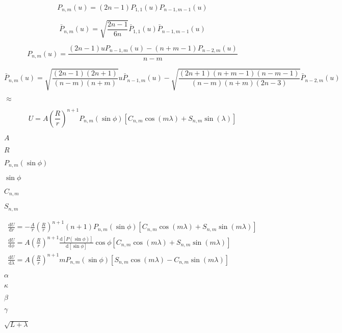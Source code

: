 \documentclass{article}
\begin{document}
\[ P_{ n, m }( u ) = ( 2 n - 1 ) P_{ 1, 1 }( u ) P_{ n - 1, m - 1 }( u ) \]
\pagebreak

\[ \bar{ P }_{ n, m }( u ) = \sqrt{ \frac{ 2 n - 1 }{ 6 n } } \bar{ P }_{ 1, 1 }( u ) \bar{ P }_{ n - 1, m - 1 }( u ) \]
\pagebreak

\[ P_{ n, m }( u ) = \frac{ ( 2 n - 1 ) u P_{ n - 1, m }( u ) - ( n + m - 1 ) P_{ n - 2, m }( u ) }{ n - m } \]
\pagebreak

\[ \bar{ P }_{ n, m }( u ) = \sqrt{ \frac{ ( 2 n - 1 )( 2 n + 1 ) }{ ( n - m ) ( n + m ) } } u \bar{ P }_{ n - 1, m }( u ) - \sqrt{ \frac{ ( 2 n + 1 )( n + m - 1 ) ( n - m - 1 ) } { ( n - m)( n + m )( 2 n - 3 ) } } \bar{ P }_{ n - 2, m }( u ) \]
\pagebreak

$\approx$
\pagebreak

\[ U = A \left( \frac{ R }{ r} \right) ^{ n + 1} P _{ n, m } ( \sin \phi ) \left[ C _{ n, m } \cos( m \lambda ) + S _{ n, m } \sin( \lambda ) \right] \]
\pagebreak

$ A $
\pagebreak

$ R $
\pagebreak

$ P _{ n, m }( \sin \phi ) $
\pagebreak

$ \sin \phi $
\pagebreak

$ C _{ n, m } $
\pagebreak

$ S _{ n, m } $
\pagebreak

\begin{eqnarray*} \frac{ \mathrm{ d } U }{ \mathrm{ d } r } = -\frac{ A }{ r } \left( \frac{ R }{ r } \right) ^{ n + 1 } ( n + 1 ) P_{ n, m }( \sin \phi )[ C_{ n, m } \cos( m \lambda ) + S_{ n,m } \sin( m \lambda ) ] \\ \frac{ \mathrm{ d } U }{ \mathrm{ d } \phi } = A \left( \frac{ R }{ r } \right)^{ n + 1 } \frac{ \mathrm{ d } [ P( \sin \phi ) ] }{ \mathrm{ d } [ \sin \phi ] } \cos \phi [ C_{ n, m } \cos( m \lambda ) + S_{ n, m } \sin( m \lambda ) ] \\ \frac{ \mathrm{ d } U }{ \mathrm{ d } \lambda } = A \left( \frac{ R }{ r } \right)^{ n + 1 } m P_{ n, m }( \sin \phi ) [ S_{ n, m } \cos( m \lambda ) - C_{ n, m } \sin( m \lambda ) ] \end{eqnarray*}
\pagebreak

$ \alpha $
\pagebreak

$ \kappa $
\pagebreak

$ \beta $
\pagebreak

$ \gamma $
\pagebreak

$ \sqrt{ L + \lambda } $
\pagebreak
\end{document}
